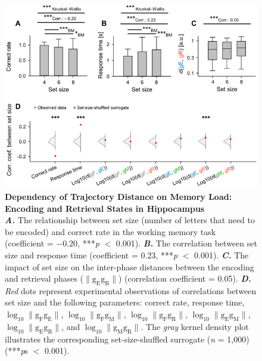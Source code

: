 \documentclass[final,3p,times,twocolumn]{elsarticle}
\begin{document}
        \clearpage
        \begin{figure}[ht]
        	\centering
            \includegraphics[width=1\textwidth]{./src/figures/.png/Figure_ID_03.png}
        	\caption{\textbf{
Dependency of Trajectory Distance on Memory Load: Encoding and Retrieval States in Hippocampus
}
\smallskip
\\
\textbf{\textit{A.}} The relationship between set size (number of letters that need to be encoded) and correct rate in the working memory task (coefficient = $-0.20$, ***\textit{p} $<$ 0.001). \textbf{\textit{B.}} The correlation between set size and response time (coefficient = 0.23, ***\textit{p} $<$ 0.001). \textbf{\textit{C.}} The impact of set size on the inter-phase distances between the encoding and retrieval phases ($\lVert \mathrm{g_{E}g_{R}} \rVert$) (correlation coefficient = 0.05). \textbf{\textit{D.}} \textit{Red} dots represent experimental observations of correlations between set size and the following parameters: correct rate, response time, $\log_{10}{\lVert \mathrm{g_{F}g_{E}} \rVert}$, $\log_{10}{\lVert \mathrm{g_{F}g_{M}} \rVert}$, $\log_{10}{\lVert \mathrm{g_{F}g_{R}} \rVert}$, $\log_{10}{\lVert \mathrm{g_{E}g_{M}} \rVert}$, $\log_{10}{\lVert \mathrm{g_{E}g_{R}} \rVert}$, and $\log_{10}{\lVert \mathrm{g_{M}g_{R}} \rVert}$. The \textit{gray} kernel density plot illustrates the corresponding set-size-shuffled surrogate (\textit{n} = 1,000) (***\textit{p}s $<$ 0.001).
}
        	\label{fig:03}
        \end{figure}
        \clearpage
\end{document}
